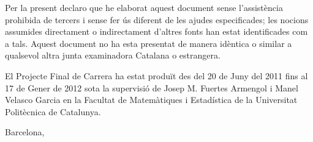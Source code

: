 


\begin{declaration}        %

Per la present declaro que he elaborat aquest document sense l'assistència prohibida de tercers i sense fer ús diferent de les ajudes especificades; les nocions assumides directament o indirectament d'altres fonts han estat identificades com a tals. Aquest document no ha esta presentat de manera idèntica o similar a qualsevol altra junta examinadora Catalana o estrangera.

El Projecte Final de Carrera ha estat produït des del 20 de Juny del 2011 fins al  17 de Gener de 2012 sota la supervisió de Josep M. Fuertes Armengol i Manel Velasco Garcia en la Facultat de Matemàtiques i Estadística de la Universitat Politècnica de Catalunya.

\vspace{10mm}

Barcelona,


\end{declaration}


